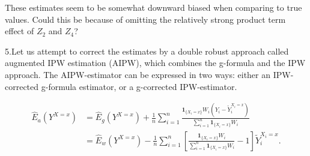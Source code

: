 \documentclass[
]{book}
\newenvironment{Shaded}{\begin{snugshade}}{\end{snugshade}}
\newcommand{\DecValTok}[1]{\textcolor[rgb]{0.00,0.00,0.81}{#1}}
\newcommand{\FunctionTok}[1]{\textcolor[rgb]{0.13,0.29,0.53}{\textbf{#1}}}
\newcommand{\NormalTok}[1]{#1}
\newcommand{\OtherTok}[1]{\textcolor[rgb]{0.56,0.35,0.01}{#1}}
\newcommand{\SpecialCharTok}[1]{\textcolor[rgb]{0.81,0.36,0.00}{\textbf{#1}}}
\begin{document}
\begin{Shaded}
\end{Shaded}

These estimates seem to be somewhat downward biased when comparing
to true values. Could this be because of omitting the
relatively strong product term effect of \(Z_2\) and \(Z_4\)?

5.Let us attempt to correct the estimates by a double robust
approach called augmented IPW estimation (AIPW),
which combines the g-formula and the IPW approach. The AIPW-estimator
can be expressed in two ways:
either an IPW-corrected g-formula estimator, or
a g-corrected IPW-estimator.

\[
\begin{aligned}
 \widehat{E}_a(Y^{X=x}) & = \widehat{E}_g(Y^{X=x}) +
   \frac{1}{n} \sum_{i=1}^n \frac{ {\mathbf 1}_{\{X_i=x\}} W_i ( Y_i - \widetilde{Y}_i^{X_i=x} ) }
   {\sum_{i=1}^n {\mathbf 1}_{\{X_i=x\}} W_i} \\
       & =   \widehat{E}_w(Y^{X=x}) -
    \frac{1}{n} \sum_{i=1}^n \left[ \frac{ {\mathbf 1}_{\{X_i=x\}} W_i }
            {\sum_{i=1}^n {\mathbf 1}_{\{X_i=x\}} W_i } - 1 \right] \widetilde{Y}_i^{X_i=x}.
\end{aligned}
\]
\end{document}
